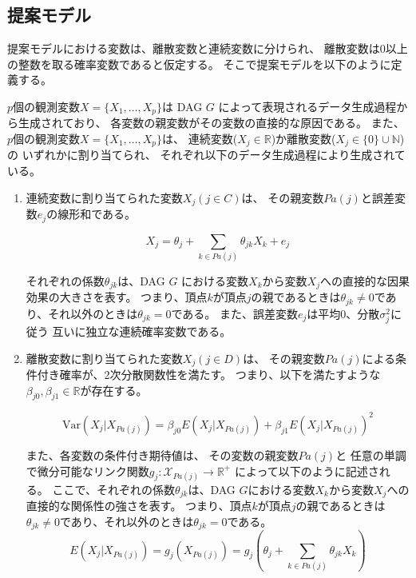 
\subsection{提案モデル}

提案モデルにおける変数は、離散変数と連続変数に分けられ、
離散変数は0以上の整数を取る確率変数であると仮定する。
そこで提案モデルを以下のように定義する。

\begin{df}[提案モデル] \label{prop_model}
  $p$個の観測変数$X = \{ X_1, \dots, X_p \}$は
  DAG $G$ によって表現されるデータ生成過程から生成されており、
  各変数の親変数がその変数の直接的な原因である。
  また、$p$個の観測変数$X = \{ X_1, \dots, X_p \}$は、
  連続変数($X_j \in \mathbb R$)か離散変数($X_j \in \{0 \}\cup \mathbb N$)の
  いずれかに割り当てられ、
  それぞれ以下のデータ生成過程により生成されている。

  \begin{enumerate}
    \setlength{\itemsep}{0.3cm}
    \item
    連続変数に割り当てられた変数$X_j (j \in C)$は、
    その親変数$Pa(j)$と誤差変数$e_j$の線形和である。

    \begin{equation}
      X_j = \theta_{j} + \sum_{k \in Pa(j)} \theta_{jk}X_k + e_j
      \label{eq:anm_prop}
    \end{equation}

    それぞれの係数$\theta_{jk}$は、DAG $G$ における変数$X_k$から変数$X_j$への直接的な因果効果の大きさを表す。
    つまり、頂点$k$が頂点$j$の親であるときは$\theta_{jk} \neq 0$であり、それ以外のときは$\theta_{jk} = 0$である。
    また、誤差変数$e_j$は平均0、分散$\sigma_j^2$に従う
    互いに独立な連続確率変数である。

    \item
    離散変数に割り当てられた変数$X_j (j \in D)$は、
    その親変数$Pa(j)$による条件付き確率が、2次分散関数性を満たす。
    つまり、以下を満たすような$\beta_{j0},\beta_{j1} \in \mathbb{R}$が存在する。

    \begin{equation}
      \mathrm{Var}(X_j|X_{Pa(j)}) = \beta_{j0} E(X_j | X_{Pa(j)}) + \beta_{j1} E(X_j | X_{Pa(j)})^2
      \label{QVF_prop}
    \end{equation}

    また、各変数の条件付き期待値は、
    その変数の親変数$Pa(j)$と
    任意の単調で微分可能なリンク関数$g_j \colon \mathcal X_{Pa(j)} \rightarrow \mathbb R^+$
    によって以下のように記述される。
    ここで、それぞれの係数$\theta_{jk}$は、DAG $G$における変数$X_k$から変数$X_j$への直接的な関係性の強さを表す。
    つまり、頂点$k$が頂点$j$の親であるときは$\theta_{jk} \neq 0$であり、それ以外のときは$\theta_{jk} = 0$である。
    \begin{equation*}
      E(X_j | X_{Pa(j)})
      = g_j(X_{Pa(j)})
      = g_j \left(\theta_j + \sum_{k \in Pa(j)} \theta_{jk}X_k \right)
    \end{equation*}

  \end{enumerate}
\end{df}


